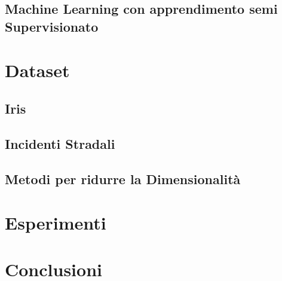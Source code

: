 \documentclass[11pt,a4paper]{book}
\begin{document}
		\section{Machine Learning con apprendimento semi Supervisionato}
	\chapter{Dataset}
		\section{Iris}
		\section{Incidenti Stradali}
		\section{Metodi per ridurre la Dimensionalità}
		
	\chapter{Esperimenti}
	\chapter{Conclusioni}
\end{document}
